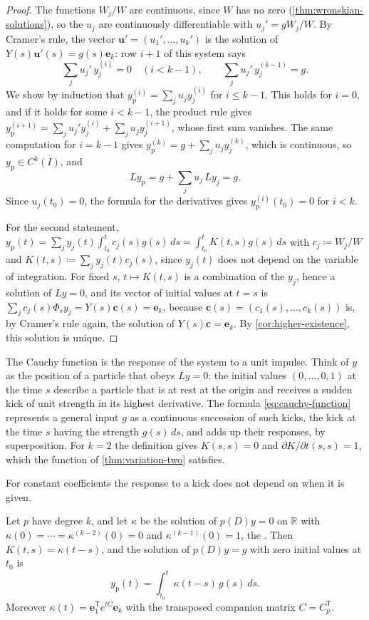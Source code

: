 \begin{proof}
The functions $W_j/W$ are continuous, since $W$ has no zero (\cref{thm:wronskian-solutions}), so the $u_j$ are continuously differentiable with $u_j'=gW_j/W$. By Cramer's rule, the vector $\mathbf u'=(u_1',\ldots,u_k')$ is the solution of $Y(s)\mathbf u'(s)=g(s)\mathbf e_k$: row $i+1$ of this system says
\[
\sum_ju_j'\,y_j^{(i)}=0\quad(i<k-1),\qquad\sum_ju_j'\,y_j^{(k-1)}=g .
\]
We show by induction that $y_{\mathrm p}^{(i)}=\sum_ju_jy_j^{(i)}$ for $i\le k-1$. This holds for $i=0$, and if it holds for some $i<k-1$, the product rule gives $y_{\mathrm p}^{(i+1)}=\sum_ju_j'y_j^{(i)}+\sum_ju_jy_j^{(i+1)}$, whose first sum vanishes. The same computation for $i=k-1$ gives $y_{\mathrm p}^{(k)}=g+\sum_ju_jy_j^{(k)}$, which is continuous, so $y_{\mathrm p}\in C^k(I)$, and
\[
Ly_{\mathrm p}=g+\sum_ju_j\,Ly_j=g .
\]
Since $u_j(t_0)=0$, the formula for the derivatives gives $y_{\mathrm p}^{(i)}(t_0)=0$ for $i<k$.

For the second statement, $y_{\mathrm p}(t)=\sum_jy_j(t)\int_{t_0}^tc_j(s)g(s)\,ds=\int_{t_0}^tK(t,s)g(s)\,ds$ with $c_j\coloneqq W_j/W$ and $K(t,s)\coloneqq\sum_jy_j(t)c_j(s)$, since $y_j(t)$ does not depend on the variable of integration. For fixed $s$, $t\mapsto K(t,s)$ is a combination of the $y_j$, hence a solution of $Ly=0$, and its vector of initial values at $t=s$ is $\sum_jc_j(s)\Phi_sy_j=Y(s)\mathbf c(s)=\mathbf e_k$, because $\mathbf c(s)=(c_1(s),\ldots,c_k(s))$ is, by Cramer's rule again, the solution of $Y(s)\mathbf c=\mathbf e_k$. By \cref{cor:higher-existence}, this solution is unique.
\end{proof}

The Cauchy function is the response of the system to a unit impulse. Think of $y$ as the position of a particle that obeys $Ly=0$: the initial values $(0,\ldots,0,1)$ at the time $s$ describe a particle that is at rest at the origin and receives a sudden kick of unit strength in its highest derivative. The formula \eqref{eq:cauchy-function} represents a general input $g$ as a continuous succession of such kicks, the kick at the time $s$ having the strength $g(s)\,ds$, and adds up their responses, by superposition. For $k=2$ the definition gives $K(s,s)=0$ and $\partial K/\partial t(s,s)=1$, which the function of \cref{thm:variation-two} satisfies.

For constant coefficients the response to a kick does not depend on when it is given.

\begin{corollary}
\label{cor:convolution}
Let $p$ have degree $k$, and let $\kappa$ be the solution of $p(D)y=0$ on $\mathbb R$ with $\kappa(0)=\cdots=\kappa^{(k-2)}(0)=0$ and $\kappa^{(k-1)}(0)=1$, the . Then $K(t,s)=\kappa(t-s)$, and the solution of $p(D)y=g$ with zero initial values at $t_0$ is
\[
y_{\mathrm p}(t)=\int_{t_0}^t\kappa(t-s)\,g(s)\,ds .
\]
Moreover $\kappa(t)=\mathbf e_1^{\mathsf T}e^{tC}\mathbf e_k$ with the transposed companion matrix $C=C_p^{\mathsf T}$.
\end{corollary}


